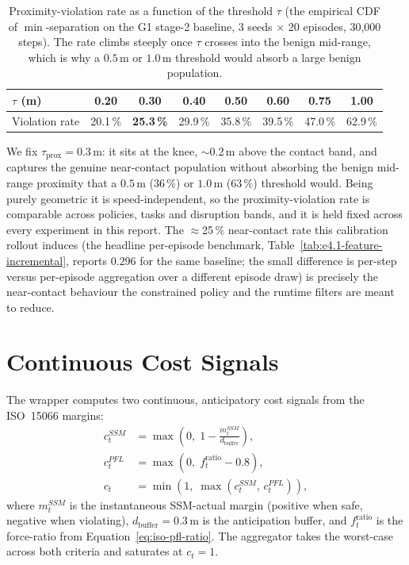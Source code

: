 \documentclass[11pt,a4paper]{report}
\newcommand{\ssm}{SSM}
\newcommand{\pfl}{PFL}
\newcommand{\iso}{ISO~15066}
\begin{document}
\begin{table}[htbp]
\centering
\small
\caption{Proximity-violation rate as a function of the threshold
$\tau$ (the empirical CDF of $\min$-separation on the G1 stage-2
baseline, 3 seeds $\times$ 20 episodes, 30{,}000 steps). The rate
climbs steeply once $\tau$ crosses into the benign mid-range, which is
why a $0.5$\,m or $1.0$\,m threshold would absorb a large benign
population.}
\label{tab:prox-calib}
\begin{tabular}{lccccccc}
\toprule
$\tau$ (m) & 0.20 & \textbf{0.30} & 0.40 & 0.50 & 0.60 & 0.75 & 1.00 \\
\midrule
Violation rate & 20.1\,\% & \textbf{25.3\,\%} & 29.9\,\% & 35.8\,\% & 39.5\,\% & 47.0\,\% & 62.9\,\% \\
\bottomrule
\end{tabular}
\end{table}

We fix $\tau_{\mathrm{prox}} = 0.3$\,m: it sits at the knee, $\sim$0.2\,m
above the contact band, and captures the genuine near-contact
population without absorbing the benign mid-range proximity that a
$0.5$\,m ($36\,\%$) or $1.0$\,m ($63\,\%$) threshold would. Being
purely geometric it is speed-independent, so the proximity-violation
rate is comparable across policies, tasks and disruption bands, and it
is held fixed across every experiment in this report. The
$\approx$25\,\% near-contact rate this calibration rollout induces (the
headline per-episode benchmark, Table~\ref{tab:e4.1-feature-incremental},
reports $0.296$ for the same baseline; the small difference is
per-step versus per-episode aggregation over a different episode draw)
is precisely the near-contact behaviour the constrained policy and the
runtime filters are meant to reduce.

\section{Continuous Cost Signals}
\label{sec:bench:cost}

The wrapper computes two continuous, anticipatory cost signals from
the \iso{} margins:
\begin{align}
  c^{\ssm}_t  &= \max\!\left(0,\; 1 - \frac{m^{\ssm}_t}{d_{\mathrm{buffer}}}\right),
    \label{eq:c-ssm} \\
  c^{\pfl}_t  &= \max\!\left(0,\; f^{\mathrm{ratio}}_t - 0.8\right),
    \label{eq:c-pfl} \\
  c_t         &= \min\!\left(1,\; \max(c^{\ssm}_t,\, c^{\pfl}_t)\right),
    \label{eq:c-total}
\end{align}
where $m^{\ssm}_t$ is the instantaneous \ssm{}-actual margin
(positive when safe, negative when violating), $d_{\mathrm{buffer}}
= 0.3$\,m is the anticipation buffer, and $f^{\mathrm{ratio}}_t$ is
the force-ratio from Equation~\ref{eq:iso-pfl-ratio}. The
aggregator takes the worst-case across both criteria and saturates
at $c_t = 1$.
\end{document}
